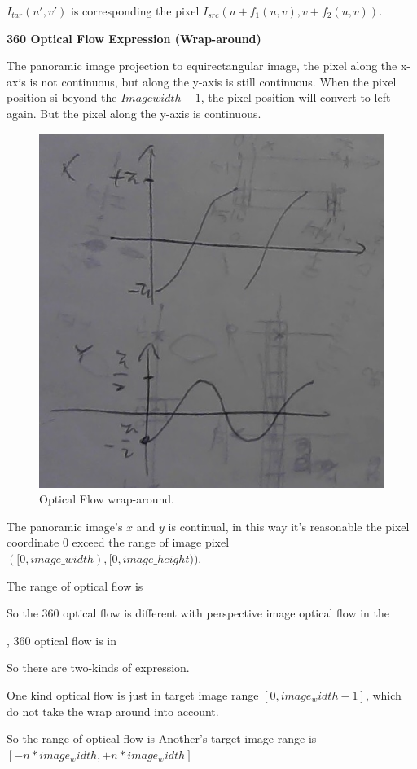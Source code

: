 $I_{tar}(u',v')$ is corresponding the pixel $I_{src}(u + f_1(u,v), v + f_2(u,v))$.

\textbf{360 Optical Flow Expression (Wrap-around)}

The panoramic image projection to equirectangular image, the pixel along the x-axis is not continuous, but along the y-axis is still continuous. When the pixel position si beyond the  ${Imagewidth -1}$, the pixel position will convert to left again.
But the pixel along the y-axis is continuous.

\begin{figure}[hbt!]
	\centering
	\includegraphics[width=0.45\linewidth]{images/wrap-around-0.jpg}
	\caption{Optical Flow wrap-around.}
	\label{fig:app:warparound}
\end{figure}

The panoramic image's $x$ and $y$ is continual, in this way it's reasonable the pixel coordinate 0 exceed the range of image pixel $([0, image\_width), [0, image\_height))$. 

The range of optical flow is 

So the 360 optical flow is different with perspective image optical flow in the 

, 360 optical flow is  in 

So there are two-kinds of expression.

One kind optical flow is just in target image range $[0, image_width - 1]$, which do not take the wrap around into account.

So the range of optical flow is 
Another's target image range is $[- n * image_width, + n * image_width]$


